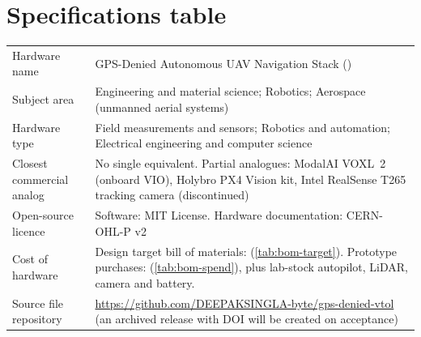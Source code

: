 \section*{Specifications table}

\vspace{-1mm}
\begingroup
\centering
\footnotesize
\renewcommand{\arraystretch}{1.1}
\begin{tabularx}{\textwidth}{p{} L}
\toprule
Hardware name & GPS-Denied Autonomous UAV Navigation Stack () \\
Subject area & Engineering and material science; Robotics; Aerospace (unmanned aerial systems) \\
Hardware type & Field measurements and sensors; Robotics and automation; Electrical engineering and computer science \\
Closest commercial analog & No single equivalent. Partial analogues: ModalAI VOXL~2 (onboard VIO), Holybro PX4 Vision kit, Intel RealSense T265 tracking camera (discontinued) \\
Open-source licence & Software: MIT License. Hardware documentation: CERN-OHL-P v2 \\
Cost of hardware & Design target bill of materials:  (\cref{tab:bom-target}). Prototype purchases:  (\cref{tab:bom-spend}), plus lab-stock autopilot, LiDAR, camera and battery. \\
Source file repository & \url{https://github.com/DEEPAKSINGLA-byte/gps-denied-vtol} (an archived release with DOI will be created on acceptance) \\
\bottomrule
\end{tabularx}\par
\endgroup

